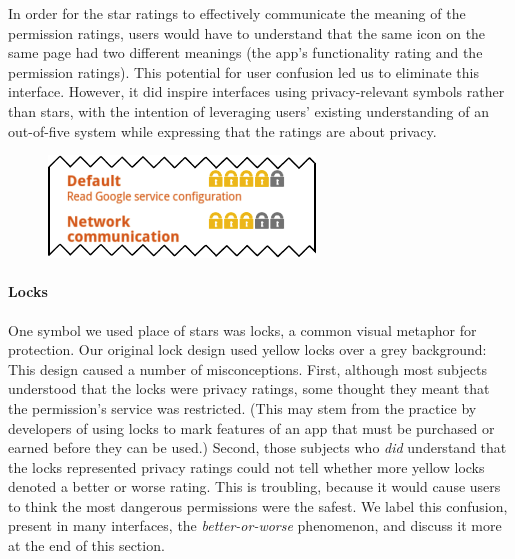 \documentclass[11pt]{article}
\begin{document}
In order for the star ratings to effectively communicate the meaning of the permission 
ratings, users would have to understand that the same icon
on the same page had two different meanings (the app's functionality
rating and the permission ratings). This potential for user confusion led
us to eliminate this interface.
However, it did inspire interfaces using privacy-relevant symbols rather than stars, with 
the intention of
leveraging users' existing understanding of an out-of-five system while
expressing that the ratings are about privacy.


\begin{figure}
\begin{center}
\includegraphics[width=.9\linewidth]{candidate-img/locks/locksR1.png}
\end{center}
\end{figure}

\paragraph{Locks}
\label{s-sec-locks}

One symbol we used place of stars was locks, a common visual metaphor for protection.
Our original lock design used yellow locks over a grey background:
This design caused a number of
misconceptions.
First, although most subjects understood that the locks were privacy 
ratings, some thought they meant that 
the permission's service was restricted. (This may 
stem from the practice by developers of using locks to mark features of 
an app that must be purchased or earned before they can be used.)
Second, those subjects who \emph{did} understand that the locks represented privacy ratings
could not tell whether more yellow locks denoted a better or worse 
rating. This is troubling, because it would cause users to think the most 
dangerous permissions were the safest. We label this confusion,
present in many interfaces, the 
\emph{better-or-worse} phenomenon, and discuss it more at the end
of this section.
\end{document}
